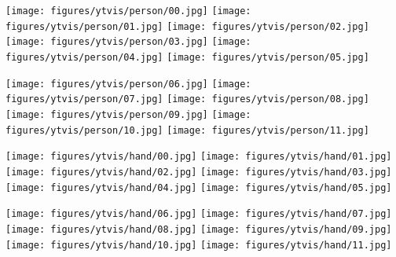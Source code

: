 \documentclass[10pt,twocolumn,letterpaper]{article}
\begin{document}
\begin{figure*}[t]

\begin{minipage}[c]{1.00\linewidth}
\texttt{[image: figures/ytvis/person/00.jpg]}
\texttt{[image: figures/ytvis/person/01.jpg]}
\texttt{[image: figures/ytvis/person/02.jpg]}
\texttt{[image: figures/ytvis/person/03.jpg]}
\texttt{[image: figures/ytvis/person/04.jpg]}
\texttt{[image: figures/ytvis/person/05.jpg]}
\end{minipage}\hfill
\begin{minipage}[c]{1.0\linewidth}
\texttt{[image: figures/ytvis/person/06.jpg]}
\texttt{[image: figures/ytvis/person/07.jpg]}
\texttt{[image: figures/ytvis/person/08.jpg]}
\texttt{[image: figures/ytvis/person/09.jpg]}
\texttt{[image: figures/ytvis/person/10.jpg]}
\texttt{[image: figures/ytvis/person/11.jpg]}
\end{minipage}\hfill\vspace{1mm}

\begin{minipage}[c]{1.00\linewidth}
\texttt{[image: figures/ytvis/hand/00.jpg]}
\texttt{[image: figures/ytvis/hand/01.jpg]}
\texttt{[image: figures/ytvis/hand/02.jpg]}
\texttt{[image: figures/ytvis/hand/03.jpg]}
\texttt{[image: figures/ytvis/hand/04.jpg]}
\texttt{[image: figures/ytvis/hand/05.jpg]}
\end{minipage}\hfill
\begin{minipage}[c]{1.0\linewidth}
\texttt{[image: figures/ytvis/hand/06.jpg]}
\texttt{[image: figures/ytvis/hand/07.jpg]}
\texttt{[image: figures/ytvis/hand/08.jpg]}
\texttt{[image: figures/ytvis/hand/09.jpg]}
\texttt{[image: figures/ytvis/hand/10.jpg]}
\texttt{[image: figures/ytvis/hand/11.jpg]}
\end{minipage}\hfill\vspace{1mm}


\end{figure*}
\end{document}
